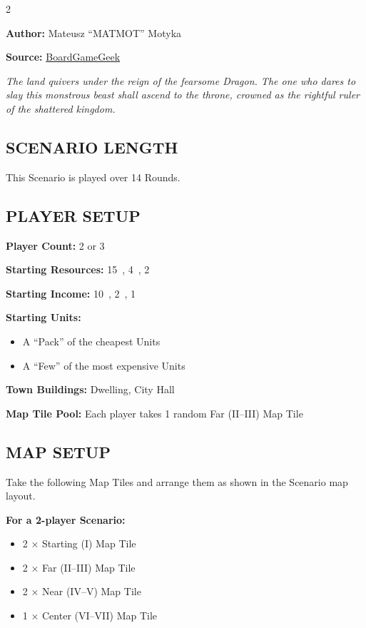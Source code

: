 
\begin{multicols*}{2}

\textbf{Author:} Mateusz ``MATMOT'' Motyka

\textbf{Source:} \href{https://boardgamegeek.com/filepage/277736/clash-scenario-the-hunt-v10}{BoardGameGeek}

\textit{The land quivers under the reign of the fearsome Dragon.
  The one who dares to slay this monstrous beast shall ascend to the throne, crowned as the rightful ruler of the shattered kingdom.
}

\subsection*{\MakeUppercase{Scenario Length}}
This Scenario is played over 14 Rounds.

\subsection*{\MakeUppercase{Player Setup}}
\textbf{Player Count:} 2 or 3

\textbf{Starting Resources:} 15~, 4~, 2~

\textbf{Starting Income:} 10~, 2~, 1~

\textbf{Starting Units:}
\begin{itemize}
  \item A ``Pack'' of the cheapest  Units
  \item A ``Few'' of the most expensive  Units
\end{itemize}

\textbf{Town Buildings:}  Dwelling, City Hall

\textbf{Map Tile Pool:} Each player takes 1 random Far (II--III) Map Tile

\subsection*{\MakeUppercase{Map Setup}}

Take the following Map Tiles and arrange them as shown in the Scenario map layout.

\textbf{For a 2-player Scenario:}
\begin{itemize}
  \item 2 × Starting (I) Map Tile
  \item 2 × Far (II--III) Map Tile
  \item 2 × Near (IV--V) Map Tile
  \item 1 × Center (VI--VII) Map Tile
\end{itemize}
\columnbreak


\end{multicols*}
